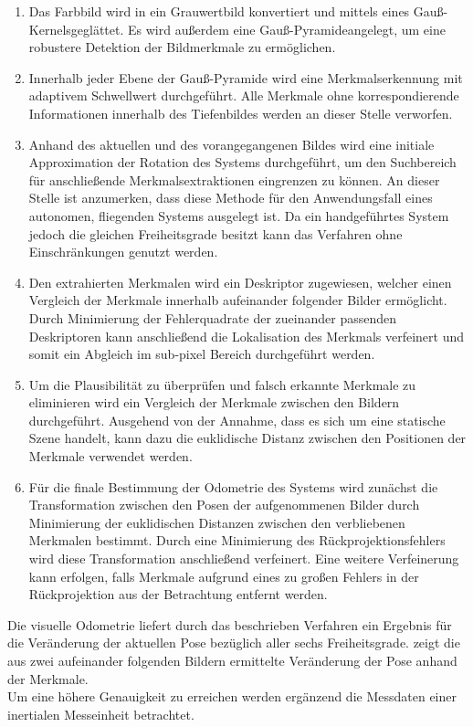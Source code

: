 \begin{enumerate}
\item Das Farbbild wird in ein Grauwertbild konvertiert und mittels eines Gauß-Kernels\red[erklären?] geglättet. Es wird außerdem eine Gauß-Pyramide\red[footnote?] angelegt, um eine robustere Detektion der Bildmerkmale zu ermöglichen.
\item Innerhalb jeder Ebene der Gauß-Pyramide wird eine Merkmalserkennung mit adaptivem Schwellwert durchgeführt. Alle Merkmale ohne korrespondierende Informationen innerhalb des Tiefenbildes werden an dieser Stelle verworfen.
\item Anhand des aktuellen und des vorangegangenen Bildes wird eine initiale Approximation der Rotation des Systems durchgeführt, um den Suchbereich für anschließende Merkmalsextraktionen eingrenzen zu können. An dieser Stelle ist anzumerken, dass diese Methode für den Anwendungsfall eines autonomen, fliegenden Systems ausgelegt ist. Da ein handgeführtes System jedoch die gleichen Freiheitsgrade besitzt kann das Verfahren ohne Einschränkungen genutzt werden.
\item Den extrahierten Merkmalen wird ein Deskriptor zugewiesen, welcher einen Vergleich der Merkmale innerhalb aufeinander folgender Bilder ermöglicht. Durch Minimierung der Fehlerquadrate der zueinander passenden Deskriptoren kann anschließend die Lokalisation des Merkmals verfeinert und somit ein Abgleich im sub-pixel Bereich durchgeführt werden.
\item Um die Plausibilität zu überprüfen und falsch erkannte Merkmale zu eliminieren wird ein Vergleich der Merkmale zwischen den Bildern durchgeführt. Ausgehend von der Annahme, dass es sich um eine statische Szene handelt, kann dazu die euklidische Distanz zwischen den Positionen der Merkmale verwendet werden.
\item Für die finale Bestimmung der Odometrie des Systems wird zunächst die Transformation zwischen den Posen der aufgenommenen Bilder durch Minimierung der euklidischen Distanzen zwischen den verbliebenen Merkmalen bestimmt. Durch eine Minimierung des Rückprojektionsfehlers wird diese Transformation anschließend verfeinert. Eine weitere Verfeinerung kann erfolgen, falls Merkmale aufgrund eines zu großen Fehlers in der Rückprojektion aus der Betrachtung entfernt werden.
\end{enumerate}
Die visuelle Odometrie liefert durch das beschrieben Verfahren ein Ergebnis für die Veränderung der aktuellen Pose bezüglich aller sechs Freiheitsgrade.  \red[(c)] zeigt die aus zwei aufeinander folgenden Bildern ermittelte Veränderung der Pose anhand der Merkmale.\\
Um eine höhere Genauigkeit zu erreichen werden ergänzend die Messdaten einer inertialen Messeinheit betrachtet.

